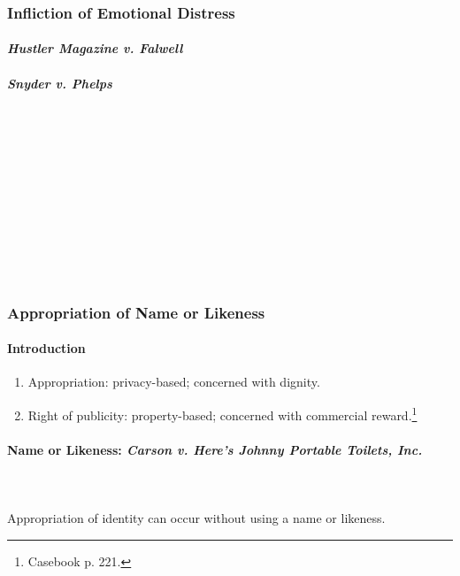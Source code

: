 
\newpage %

\subsubsection{Infliction of Emotional Distress}

\paragraph{\emph{Hustler Magazine v. Falwell}}

\newpage %
\paragraph{\emph{Snyder v. Phelps}}

~\\\\\\\\\\\\\\\\\\\\

\subsubsection{Appropriation of Name or Likeness}

\paragraph{Introduction}

\begin{enumerate}
    \item Appropriation: privacy-based; concerned with dignity.
    \item Right of publicity: property-based; concerned with commercial 
    reward.\footnote{Casebook p. 221.}
\end{enumerate}

\paragraph{Name or Likeness: \emph{Carson v. Here's Johnny Portable Toilets, 
Inc.}}
~\\\\
Appropriation of identity can occur without using a name or likeness.

